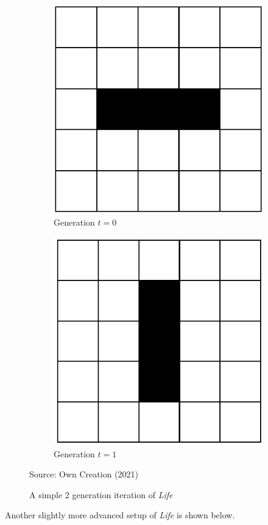 \begin{figure}[H]
\centering
\begin{subfigure}{.5\textwidth}
  \centering
  \includegraphics[width=.4\linewidth]{Figures/Chapter2/blink1.png}
  \caption{Generation $t = 0$}
\end{subfigure}%
\begin{subfigure}{.5\textwidth}
  \centering
  \includegraphics[width=.4\linewidth]{Figures/Chapter2/blink2.png}
  \caption{Generation $t = 1$}
\end{subfigure}
\caption{A simple 2 generation iteration of \textsl{Life}}
\begin{center}
Source: Own Creation (2021)
\end{center}
\end{figure}
Another slightly more advanced setup of \textsl{Life} is shown below.
